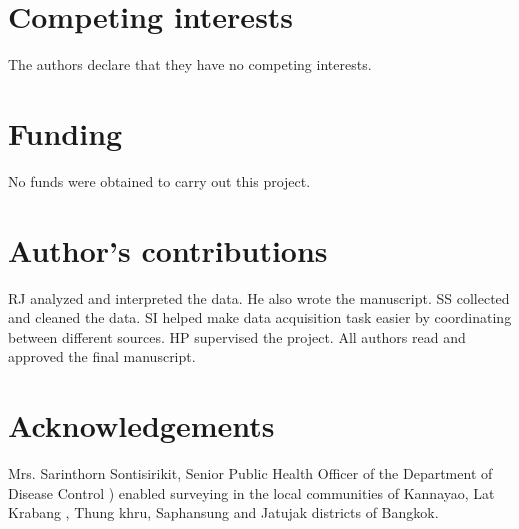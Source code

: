 \documentclass{bmcart}
\begin{document}
\begin{backmatter}
\section*{Competing interests}
The authors declare that they have no competing interests.


\section*{Funding}

No funds were obtained to carry out this project.


\section*{Author's contributions}

RJ analyzed and interpreted the data. He also wrote the manuscript. SS collected and cleaned the data. SI helped make data acquisition task easier by coordinating between different sources. HP supervised the project. All authors read and approved the final manuscript. 
    
      
\section*{Acknowledgements}
Mrs. Sarinthorn Sontisirikit, Senior Public Health Officer of the Department of Disease Control ) enabled surveying in the local communities of Kannayao, Lat Krabang , Thung khru, Saphansung and Jatujak districts of Bangkok.
  

\clearpage





\end{backmatter}
\end{document}
